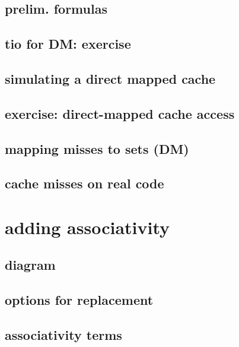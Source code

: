 \subsection{prelim. formulas}


\subsection{tio for DM: exercise}


\subsection{simulating a direct mapped cache}


\subsection{exercise: direct-mapped cache access}


\subsection{mapping misses to sets (DM)}


\subsection{cache misses on real code}


\section{adding associativity}


\subsection{diagram}


\subsection{options for replacement}




\subsection{associativity terms}


